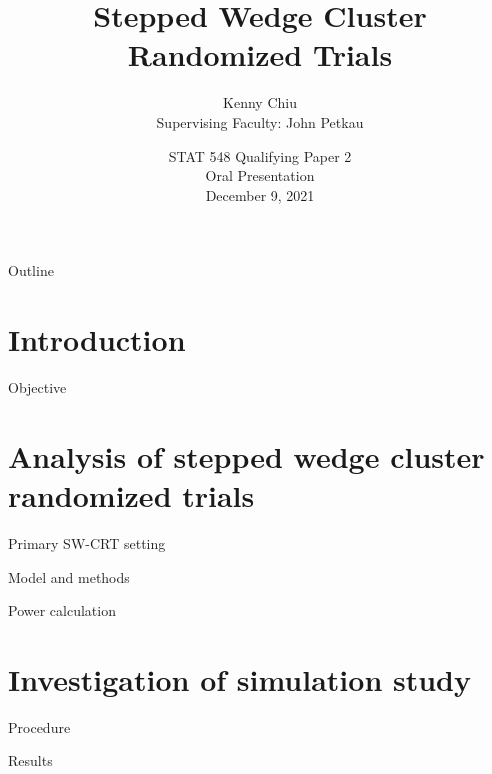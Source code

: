 \documentclass[9pt]{beamer}
\title{Stepped Wedge Cluster Randomized Trials}
\author[Kenny Chiu]{\large Kenny Chiu\\\vspace{0.5em} \footnotesize Supervising Faculty: John Petkau}
\institute[]{\footnotesize The University of British Columbia\\Department of Statistics}
\date[August 24, 2021]{\large STAT 548 Qualifying Paper 2\\\normalsize Oral Presentation\\\vspace{0.5em}\footnotesize December 9, 2021}
\begin{document}
\begin{frame}
\titlepage
\end{frame}



\begin{frame}{Outline}
\tableofcontents
\end{frame}


\section{Introduction}



\begin{frame}{\citet{Hussey:2007}}
\end{frame}



\begin{frame}{Objective}
\end{frame}



\section{Analysis of stepped wedge cluster randomized trials}



\begin{frame}{Primary SW-CRT setting}
\end{frame}



\begin{frame}{Model and methods}
\end{frame}



\begin{frame}{Power calculation}
\end{frame}



\section{Investigation of simulation study}



\begin{frame}{Procedure}
\end{frame}



\begin{frame}{Results}
\end{frame}
\end{document}
